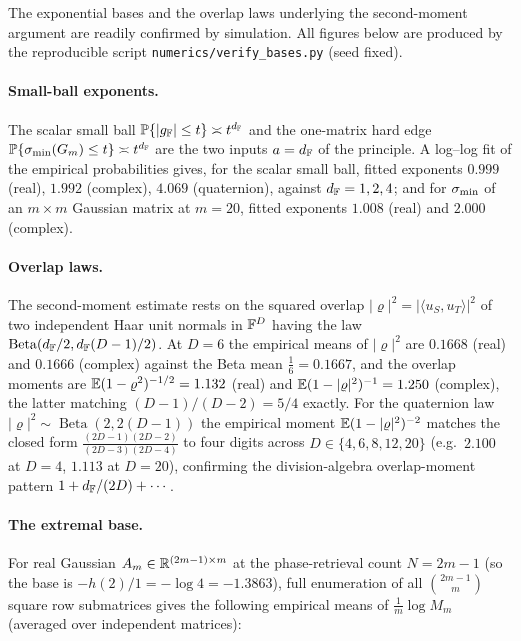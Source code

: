 
The exponential bases and the overlap laws underlying the second-moment argument
are readily confirmed by simulation.  All figures below are produced by the
reproducible script \texttt{numerics/verify\_bases.py} (seed fixed).

\paragraph{Small-ball exponents.}
The scalar small ball $\mathbb{P}\{|g_{\mathbb{F}}|\le t\}\asymp t^{d_{\mathbb{F}}}$ and the one-matrix hard
edge $\mathbb{P}\{\sigma_{\min}(G_m)\le t\}\asymp t^{d_{\mathbb{F}}}$ are the two inputs $a=d_{\mathbb{F}}$ of the
principle.  A log--log fit of the empirical probabilities gives, for the scalar
small ball, fitted exponents $0.999$ (real), $1.992$ (complex), $4.069$
(quaternion), against $d_{\mathbb{F}}=1,2,4$; and for $\sigma_{\min}$ of an $m\times m$ Gaussian
matrix at $m=20$, fitted exponents $1.008$ (real) and $2.000$ (complex).

\paragraph{Overlap laws.}
The second-moment estimate rests on the squared overlap $|\varrho|^2=
|\langle u_S,u_T\rangle|^2$ of two independent Haar unit normals in $\mathbb{F}^D$ having
the law $\operatorname{Beta}(d_{\mathbb{F}}/2,d_{\mathbb{F}}(D-1)/2)$.  At $D=6$ the empirical means of
$|\varrho|^2$ are $0.1668$ (real) and $0.1666$ (complex) against the Beta mean
$\tfrac{1}{6}=0.1667$, and the overlap moments are
$\mathbb{E}(1-\varrho^2)^{-1/2}=1.132$ (real) and $\mathbb{E}(1-|\varrho|^2)^{-1}=1.250$
(complex), the latter matching $(D-1)/(D-2)=5/4$ exactly.  For the quaternion law
$|\varrho|^2\sim\operatorname{Beta}(2,2(D-1))$ the empirical moment
$\mathbb{E}(1-|\varrho|^2)^{-2}$ matches the closed form
$\tfrac{(2D-1)(2D-2)}{(2D-3)(2D-4)}$ to four digits across $D\in\{4,6,8,12,20\}$
(e.g.\ $2.100$ at $D=4$, $1.113$ at $D=20$), confirming the division-algebra
overlap-moment pattern $1+d_{\mathbb{F}}/(2D)+\cdots$.

\paragraph{The extremal base.}
For real Gaussian $A_m\in\mathbb{R}^{(2m-1)\times m}$ at the phase-retrieval count
$N=2m-1$ (so the base is $-h(2)/1=-\log4=-1.3863$), full enumeration of all
$\binom{2m-1}{m}$ square row submatrices gives the following empirical means of
$\tfrac1m\log M_m$ (averaged over independent matrices):

